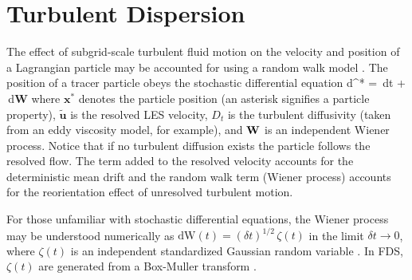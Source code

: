 \section{Turbulent Dispersion}

The effect of subgrid-scale turbulent fluid motion on the velocity and position of a Lagrangian particle may be accounted for using a random walk model \cite{Raman:CF}.  The position of a tracer particle obeys the stochastic differential equation
\be
\mbox{d}^* =  \,\mbox{d}t +  \,\mbox{d}\mbox{\textbf{W}}
\ee
where $\mathbf{x}^*$ denotes the particle position (an asterisk signifies a particle property), $\tilde{\mathbf{u}}$ is the resolved LES velocity, $D_t$ is the turbulent diffusivity (taken from an eddy viscosity model, for example), and $\mbox{\textbf{W}}$ is an independent Wiener process.  Notice that if no turbulent diffusion exists the particle follows the resolved flow.  The term added to the resolved velocity accounts for the deterministic mean drift and the random walk term (Wiener process) accounts for the reorientation effect of unresolved turbulent motion.

For those unfamiliar with stochastic differential equations, the Wiener process may be understood numerically as $\mbox{dW}(t) = (\delta t)^{1/2} \, \zeta(t)$ in the limit $\delta t \rightarrow 0$, where $\zeta(t)$ is an independent standardized Gaussian random variable \cite{Pope:2000}.  In FDS, $\zeta(t)$ are generated from a Box-Muller transform \cite{Box-Muller:1958}.
